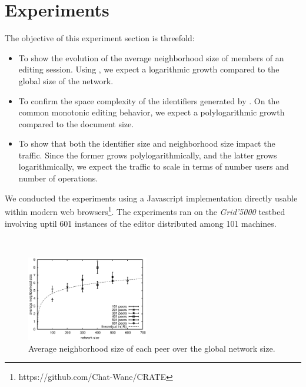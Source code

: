 \section{Experiments}
\label{sec:experiments}

The objective of this experiment section is threefold:
\begin{itemize}
\item To show the evolution of the average neighborhood size of members of an
  editing session. Using \SPRAY, we expect a logarithmic growth compared to the
  global size of the network.
\item To confirm the space complexity of the identifiers generated by \LSEQ. On
  the common monotonic editing behavior, we expect a polylogarithmic growth
  compared to the document size.
\item To show that both the identifier size and neighborhood size impact the
  traffic. Since the former grows polylogarithmically, and the latter grows
  logarithmically, we expect the traffic to scale in terms of number users and
  number of operations.
\end{itemize}

We conducted the experiments using a Javascript implementation directly usable
within modern web browsers\footnote{https://github.com/Chat-Wane/CRATE}. The
experiments ran on the \emph{Grid'5000} testbed involving uptil 601 instances of
the editor distributed among 101 machines.

\ \\ 

\begin{figure}
  \centering
  \includegraphics[width=0.475\textwidth]{./img/partialview.eps}
  \caption{\label{fig:partialview} Average neighborhood size of each peer over
  the global network size.}
\end{figure}

